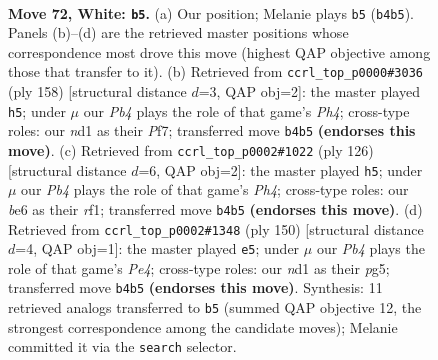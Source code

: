 \documentclass[11pt]{article}
\begin{document}
\clearpage

\begin{figure}[p]\centering
\begin{subfigure}{0.46\textwidth}\centering
\resizebox{\linewidth}{!}{%
\newchessgame
\chessboard[
  setfen={4k3/8/4b3/P7/1P6/6K1/8/3n4 w - - 10 72},
  showmover=false,
  pgfstyle=straightmove, color=movearrow, markmove={b4-b5}
]}
\caption{}
\end{subfigure}\hfill
\begin{subfigure}{0.46\textwidth}\centering
\resizebox{\linewidth}{!}{%
\newchessgame
\chessboard[
  setfen={8/5P2/8/2b3P1/4k2P/8/4K3/8 w - - 1 80},
  showmover=false,
  pgfstyle=straightmove, color=movearrow, markmove={h4-h5}
]}
\caption{}
\end{subfigure}
\\[4pt]
\begin{subfigure}{0.46\textwidth}\centering
\resizebox{\linewidth}{!}{%
\newchessgame
\chessboard[
  setfen={7k/8/3N4/6P1/7P/8/7K/5r2 w - - 1 64},
  showmover=false,
  pgfstyle=straightmove, color=movearrow, markmove={h4-h5}
]}
\caption{}
\end{subfigure}\hfill
\begin{subfigure}{0.46\textwidth}\centering
\resizebox{\linewidth}{!}{%
\newchessgame
\chessboard[
  setfen={8/5b2/3K4/5Pp1/1k2P3/8/8/8 w - - 0 76},
  showmover=false,
  pgfstyle=straightmove, color=movearrow, markmove={e4-e5}
]}
\caption{}
\end{subfigure}
\caption{\textbf{Move 72, White: \texttt{b5}.} (a) Our position; Melanie plays \texttt{b5} (\texttt{b4b5}). Panels (b)--(d) are the retrieved master positions whose correspondence most drove this move (highest QAP objective among those that transfer to it). (b) Retrieved from \texttt{ccrl\_top\_p0000\#3036} (ply 158) [structural distance $d$=3, QAP obj=2]: the master played \texttt{h5}; under $\mu$ our \emph{Pb4} plays the role of that game's \emph{Ph4}; cross-type roles: our \emph{n}d1 as their \emph{P}f7; transferred move \texttt{b4b5} \textbf{(endorses this move)}. (c) Retrieved from \texttt{ccrl\_top\_p0002\#1022} (ply 126) [structural distance $d$=6, QAP obj=2]: the master played \texttt{h5}; under $\mu$ our \emph{Pb4} plays the role of that game's \emph{Ph4}; cross-type roles: our \emph{b}e6 as their \emph{r}f1; transferred move \texttt{b4b5} \textbf{(endorses this move)}. (d) Retrieved from \texttt{ccrl\_top\_p0002\#1348} (ply 150) [structural distance $d$=4, QAP obj=1]: the master played \texttt{e5}; under $\mu$ our \emph{Pb4} plays the role of that game's \emph{Pe4}; cross-type roles: our \emph{n}d1 as their \emph{p}g5; transferred move \texttt{b4b5} \textbf{(endorses this move)}. Synthesis: 11 retrieved analogs transferred to \texttt{b5} (summed QAP objective 12, the strongest correspondence among the candidate moves); Melanie committed it via the \texttt{search} selector.}
\label{fig:thought-m142}
\end{figure}
\end{document}
